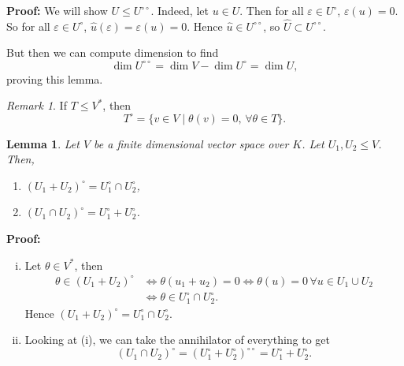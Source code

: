 \documentclass[12pt]{article}
\newtheorem{lemma}{Lemma}[section]
\theoremstyle{definition}
\theoremstyle{remark}
\newtheorem*{remark}{Remark}
\begin{document}
\begin{adjustbox}{minipage = \columnwidth - 25.5pt, margin=1em, frame=1pt, margin=0em}
	\textbf{Proof:} We will show $U \leq U^{\circ \circ}$. Indeed, let $u \in U$. Then for all $\varepsilon \in U^{\circ}$, $\varepsilon(u) = 0$. So for all $\varepsilon \in U^{\circ}$, $\hat u(\varepsilon) = \varepsilon(u) = 0$. Hence $\hat u \in U^{\circ \circ}$, so $\hat U \subset U^{\circ \circ}$.

	But then we can compute dimension to find
	\[
	\dim U^{\circ \circ} = \dim V - \dim U^{\circ} = \dim U
	,\]
	proving this lemma.
\end{adjustbox}

\begin{remark}
	If $T \leq V^{\ast}$, then
	\[
		T^{\circ} = \{v \in V \mid \theta(v) = 0, \, \forall \theta \in T\}
	.\]
\end{remark}

\begin{lemma}
	Let $V$ be a finite dimensional vector space over $K$. Let $U_1, U_2 \leq V$. Then,
	\begin{enumerate}[\normalfont(i)]
		\item $(U_1 + U_2)^{\circ} = U_1^{\circ} \cap U_2^{\circ}$,
		\item $(U_1 \cap U_2)^{\circ} = U_1^{\circ} + U_2^{\circ}$.
	\end{enumerate}
\end{lemma}

\begin{adjustbox}{minipage = \columnwidth - 25.5pt, margin=1em, frame=1pt, margin=0em}
\textbf{Proof:}
\begin{enumerate}[(i)]
	\item Let $\theta \in V^{\ast}$, then
		\begin{align*}
			\theta \in (U_1 + U_2)^{\circ} &\iff \theta(u_1 + u_2) = 0 \iff \theta(u) = 0 \, \forall u \in U_1 \cup U_2 \\
						       &\iff \theta \in U_1^{\circ} \cap U_2^{\circ}.
		\end{align*}
		Hence $(U_1 + U_2)^{\circ} = U_1^{\circ} \cap U_2^{\circ}$.
	\item Looking at (i), we can take the annihilator of everything to get
		\[
			(U_1 \cap U_2)^{\circ} = (U_1^{\circ} + U_2^{\circ})^{\circ \circ} = U_1^{\circ} + U_2^{\circ}
		.\]
\end{enumerate}
\end{adjustbox}

\newpage
\end{document}
